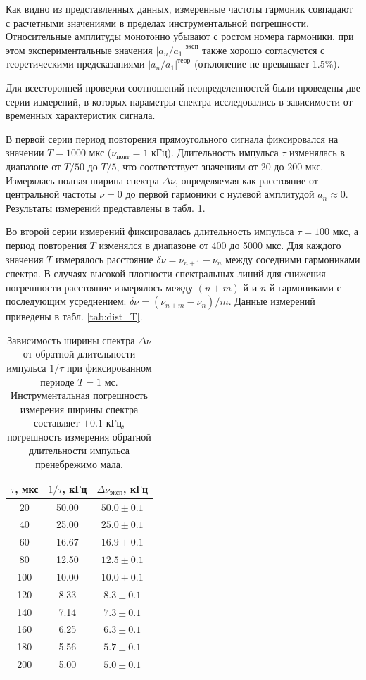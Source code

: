 \documentclass[reprint, amsmath, amssymb, aps, pra, nofootinbib]{revtex4-2}
\begin{document}
Как видно из представленных данных, измеренные частоты гармоник совпадают с расчетными значениями в пределах инструментальной погрешности. Относительные амплитуды монотонно убывают с ростом номера гармоники, при этом экспериментальные значения $|a_n/a_1|^{\text{эксп}}$ также хорошо согласуются с теоретическими предсказаниями $|a_n/a_1|^{\text{теор}}$ (отклонение не превышает 1.5\%).

Для всесторонней проверки соотношений неопределенностей были проведены две серии измерений, в которых параметры спектра исследовались в зависимости от временных характеристик сигнала. 

В первой серии период повторения прямоугольного сигнала фиксировался на значении $T = 1000$ мкс ($\nu_{\text{повт}} = 1$ кГц). Длительность импульса $\tau$ изменялась в диапазоне от $T/50$ до $T/5$, что соответствует значениям от 20 до 200 мкс. Измерялась полная ширина спектра $\Delta\nu$, определяемая как расстояние от центральной частоты $\nu = 0$ до первой гармоники с нулевой амплитудой $a_n \approx 0$. Результаты измерений представлены в табл. \ref{tab:width_tau}.

Во второй серии измерений фиксировалась длительность импульса $\tau = 100$ мкс, а период повторения $T$ изменялся в диапазоне от 400 до 5000 мкс. Для каждого значения $T$ измерялось расстояние $\delta\nu = \nu_{n+1} - \nu_n$ между соседними гармониками спектра. В случаях высокой плотности спектральных линий для снижения погрешности расстояние измерялось между $(n+m)$-й и $n$-й гармониками с последующим усреднением: $\delta\nu = (\nu_{n+m} - \nu_n)/m$. Данные измерений приведены в табл. \ref{tab:dist_T}.

\begin{table}[b!] 
    \caption{Зависимость ширины спектра $\Delta\nu$ от обратной длительности импульса $1/\tau$ при фиксированном периоде $T = 1$ мс. Инструментальная погрешность измерения ширины спектра составляет $\pm 0.1$ кГц, погрешность измерения обратной длительности импульса пренебрежимо мала.}
    \label{tab:width_tau}
    \centering
    \begin{ruledtabular}
    \begin{tabular}{ccc}
        $\tau$, мкс & $1/\tau$, кГц & $\Delta\nu_{\text{эксп}}$, кГц \\
        \hline
        20  & 50.00 & $50.0 \pm 0.1$ \\
        40  & 25.00 & $25.0 \pm 0.1$ \\
        60  & 16.67 & $16.9 \pm 0.1$ \\
        80  & 12.50 & $12.5 \pm 0.1$ \\
        100 & 10.00 & $10.0 \pm 0.1$ \\
        120 & 8.33  & $8.3 \pm 0.1$ \\
        140 & 7.14  & $7.3 \pm 0.1$ \\
        160 & 6.25  & $6.3 \pm 0.1$ \\
        180 & 5.56  & $5.7 \pm 0.1$ \\
        200 & 5.00  & $5.0 \pm 0.1$ \\
    \end{tabular}
    \end{ruledtabular}
\end{table}
\end{document}
